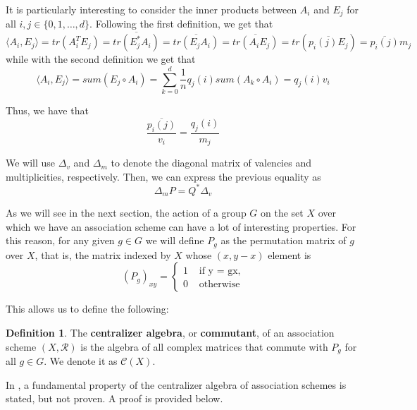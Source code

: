 \documentclass[a4paper,12pt]{article}
\theoremstyle{plain}
\theoremstyle{definition}
\newtheorem{definition}[theorem]{Definition}
\theoremstyle{remark}
\begin{document}
It is particularly interesting to consider the inner products between $ A_i $
and $ E_j $ for all $ i,j \in \{ 0,1,\dots,d \} $. Following the first
definition, we get that
\[ \langle A_i,E_j \rangle = tr(A_i^TE_j) = \overline{tr(E_j^* A_i)} =
\overline{tr(E_jA_i)} = \overline{tr(A_iE_j)} = tr(\overline{p_i(j)E_j}) =
\overline{p_i(j)}m_j\]
while with the second definition we get that
\[ \langle A_i,E_j \rangle = sum(E_j \circ A_i) =
\sum_{ k=0 }^{ d } \frac{1}{n} q_j(i) sum(A_k \circ A_i) = q_j(i)v_i \]

Thus, we have that
\[ \frac{\overline{p_i(j)}}{v_i} = \frac{q_j(i)}{m_j} \]

We will use $ \Delta_v $ and $ \Delta_m $ to denote the diagonal matrix of
valencies and multiplicities, respectively. Then, we can express the previous
equality as
\[ \Delta_m P = Q^* \Delta_v \]

As we will see in the next section, the action of a group $ G $ on the set $ X $
over which we have an association scheme can have a lot of interesting properties.
For this reason, for any given $ g \in G $ we will define $ P_g $ as the
permutation matrix of $ g $ over $ X $, that is, the matrix indexed by $ X $
whose $ (x,y-x) $ element is
\[
    (P_g)_{xy} =
    \begin{cases}
        1 &\text{ if y = gx,} \\
        0 &\text{ otherwise}
    \end{cases}
\]

This allows us to define the following:
\begin{definition}
    The \textbf{centralizer algebra}, or \textbf{commutant}, of an association scheme
    $ (X,\mathcal{R}) $ is the algebra of all complex matrices that commute with
    $ P_g $ for all $ g \in G $. We denote it as $ \mathcal{C}(X) $.
\end{definition}

In \parencite[Lemma 3.2.1]{godsil_erdoskorado_2015}, a fundamental property of the
centralizer algebra of association schemes is stated, but not proven. A proof is
provided below.
\end{document}
